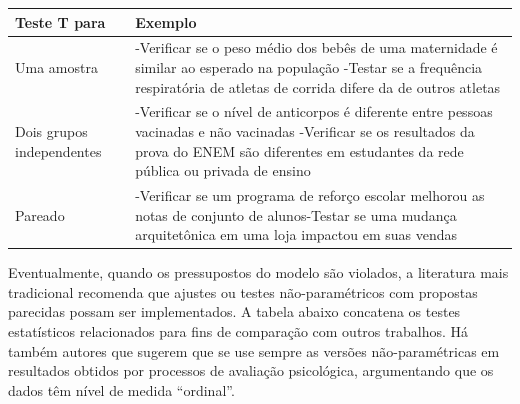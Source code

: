 \documentclass[
]{book}
\begin{document}
\begin{longtable}[]{@{}ll@{}}
\toprule
\begin{minipage}[b]{0.47\columnwidth}\raggedright
Teste T para\strut
\end{minipage} & \begin{minipage}[b]{0.47\columnwidth}\raggedright
Exemplo\strut
\end{minipage}\tabularnewline
\midrule
\endhead
\begin{minipage}[t]{0.47\columnwidth}\raggedright
Uma amostra\strut
\end{minipage} & \begin{minipage}[t]{0.47\columnwidth}\raggedright
-Verificar se o peso médio dos bebês de uma maternidade é similar ao
esperado na população -Testar se a frequência respiratória de atletas de
corrida difere da de outros atletas\strut
\end{minipage}\tabularnewline
\begin{minipage}[t]{0.47\columnwidth}\raggedright
Dois grupos independentes\strut
\end{minipage} & \begin{minipage}[t]{0.47\columnwidth}\raggedright
-Verificar se o nível de anticorpos é diferente entre pessoas vacinadas
e não vacinadas -Verificar se os resultados da prova do ENEM são
diferentes em estudantes da rede pública ou privada de ensino\strut
\end{minipage}\tabularnewline
\begin{minipage}[t]{0.47\columnwidth}\raggedright
Pareado\strut
\end{minipage} & \begin{minipage}[t]{0.47\columnwidth}\raggedright
-Verificar se um programa de reforço escolar melhorou as notas de
conjunto de alunos-Testar se uma mudança arquitetônica em uma loja
impactou em suas vendas\strut
\end{minipage}\tabularnewline
\bottomrule
\end{longtable}

Eventualmente, quando os pressupostos do modelo são violados, a
literatura mais tradicional recomenda que ajustes ou testes
não-paramétricos com propostas parecidas possam ser implementados. A
tabela abaixo concatena os testes estatísticos relacionados para fins de
comparação com outros trabalhos. Há também autores que sugerem que se
use sempre as versões não-paramétricas em resultados obtidos por
processos de avaliação psicológica, argumentando que os dados têm nível
de medida ``ordinal''.
\end{document}

